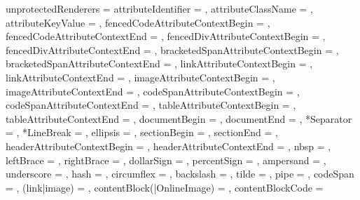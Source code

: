 unprotectedRenderers = {%
  attributeIdentifier = {%
    },
  attributeClassName = {%
    },
  attributeKeyValue = {%
    },
  fencedCodeAttributeContextBegin = {%
    },
  fencedCodeAttributeContextEnd = {%
    },
  fencedDivAttributeContextBegin = {%
    },
  fencedDivAttributeContextEnd = {%
    },
  bracketedSpanAttributeContextBegin = {%
    },
  bracketedSpanAttributeContextEnd = {%
    },
  linkAttributeContextBegin = {%
    },
  linkAttributeContextEnd = {%
    },
  imageAttributeContextBegin = {%
    },
  imageAttributeContextEnd = {%
    },
  codeSpanAttributeContextBegin = {%
    },
  codeSpanAttributeContextEnd = {%
    },
  tableAttributeContextBegin = {%
    },
  tableAttributeContextEnd = {%
    },
  documentBegin = {%
    },
  documentEnd = {%
    },
  *Separator = {%
    },
  *LineBreak = {%
    },
  ellipsis = {%
    },
  sectionBegin = {%
    },
  sectionEnd = {%
    },
  headerAttributeContextBegin = {%
    },
  headerAttributeContextEnd = {%
    },
  nbsp = {%
    },
  leftBrace = {%
    },
  rightBrace = {%
    },
  dollarSign = {%
    },
  percentSign = {%
    },
  ampersand = {%
    },
  underscore = {%
    },
  hash = {%
    },
  circumflex = {%
    },
  backslash = {%
    },
  tilde = {%
    },
  pipe = {%
    },
  codeSpan = {%
    },
  (link|image) = {%
    },
  contentBlock(|OnlineImage) = {%
    },
  contentBlockCode = {%
}}
